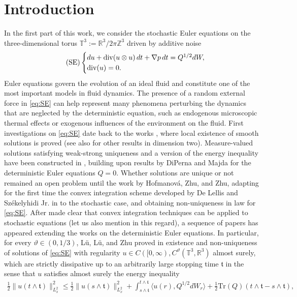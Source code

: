 \documentclass[10pt,a4paper]{amsart}
\numberwithin{equation}{section}
\numberwithin{corollario}{section}
\numberwithin{lemma}{section}
\numberwithin{prop}{section}
\theoremstyle{definition}
\theoremstyle{remark}
\newcommand{\Z}{\mathbb{Z}}
\newcommand{\R}{\mathbb{R}}
\newcommand{\T}{\mathbb{T}}
\newcommand{\dvg}{\mathord{{\rm div}}}
\begin{document}
\section{Introduction}
In the first part of this work, we consider the stochastic Euler equations on the three-dimensional torus $\T^3 := \R^3/2\pi\Z^3$ driven by additive noise
\begin{align} \label{eq:SE} \tag{SE}
\begin{cases}
d u 
+
\dvg (u\otimes u)\,dt
+
\nabla p \,dt
=
Q^{1/2} dW,
\\
\dvg(u) = 0.
\end{cases}
\end{align}
Euler equations govern the evolution of an ideal fluid and constitute one of the most important models in fluid dynamics.
The presence of a random external force in \eqref{eq:SE} can help represent many phenomena perturbing the dynamics that are neglected by the deterministic equation, such as endogenous microscopic thermal effects or exogenous influences of the environment on the fluid. 
First investigations on \eqref{eq:SE} date back to the works \cite{MiVa00,Ki09}, where local existence of smooth solutions is proved (see also \cite{BeFl99} for other results in dimension two).
Measure-valued solutions satisfying weak-strong uniqueness and a version of the energy inequality have been constructed in \cite{BrMo21}, building upon results by DiPerna and Majda \cite{DPMa87} for the deterministic Euler equations $Q=0$.
Whether solutions are unique or not remained an open problem until the work \cite{HoZhZh22} by Hofmanov\'a, Zhu, and Zhu, adapting for the first time the convex integration scheme developed by De Lellis and Székelyhidi Jr. in \cite{DLSz09} to the stochastic case, and obtaining non-uniqueness in law for \eqref{eq:SE}.
After \cite{HoZhZh22} made clear that convex integration techniques can be applied to stochastic equations (let us also mention \cite{ChFeFl21} in this regard), a sequence of papers has appeared \cite{HoZhZh25,LuZh24,KiKo24,LuLuZh25} extending the works \cite{DLS13,DLS14,BuDLIsSz15,BuDLIsSz16,Is18,BuDLSzVi19} on the deterministic Euler equations.
In particular, for every $\vartheta \in (0,1/3)$, L\"u, L\"u, and Zhu proved in \cite{LuLuZh25} existence and non-uniqueness of solutions of \eqref{eq:SE} with regularity $u \in C([0,\infty),C^\vartheta(\T^3,\R^3)$ almost surely, which are strictly dissipative up to an arbitrarily large stopping time $\mathfrak{t}$ in the sense that $u$ satisfies almost surely the energy inequality
\begin{align} \label{eq:EI}
    \frac12 \| u(t\wedge\mathfrak{t}) \|_{L^2_x}^2
    \leq
    \frac12 \| u(s\wedge\mathfrak{t}) \|_{L^2_x}^2
    +
    \int_{s \wedge \mathfrak{t}}^{t \wedge \mathfrak{t}}
    \langle u(r), Q^{1/2}dW_r \rangle + 
    \frac12 \mbox{Tr}(Q) (t \wedge \mathfrak{t}-s \wedge \mathfrak{t}),
\end{align}
\end{document}

